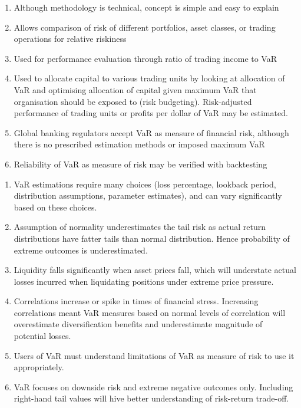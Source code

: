 \begin{remark} 
\begin{enumerate}[label=\roman*.]
\setlength{\itemsep}{0pt}
\item Although methodology is technical, concept is simple and easy to explain
\item Allows comparison of risk of different portfolios, asset classes, or trading operations for relative riskiness
\item Used for performance evaluation through ratio of trading income to VaR
\item Used to allocate capital to various trading units by looking at allocation of VaR and optimising allocation of capital given maximum VaR that organisation should be exposed to (risk budgeting). Risk-adjusted performance of trading units or profits per dollar of VaR may be estimated.
\item Global banking regulators accept VaR as measure of financial risk, although there is no prescribed estimation methods or imposed maximum VaR
\item Reliability of VaR as measure of risk may be verified with backtesting
\end{enumerate}
\end{remark}

\begin{remark} 
\begin{enumerate}[label=\roman*.]
\setlength{\itemsep}{0pt}
\item VaR estimations require many choices (loss percentage, lookback period, distribution assumptions, parameter estimates), and can vary significantly based on these choices.
\item Assumption of normality underestimates the tail risk as actual return distributions have fatter tails than normal distribution. Hence probability of extreme outcomes is underestimated.
\item Liquidity falls significantly when asset prices fall, which will understate actual losses incurred when liquidating positions under extreme price pressure.
\item Correlations increase or spike in times of financial stress. Increasing correlations meant VaR measures based on normal levels of correlation will overestimate diversification benefits and underestimate magnitude of potential losses.
\item Users of VaR must understand limitations of VaR as measure of risk to use it appropriately.
\item VaR focuses on downside risk and extreme negative outcomes only. Including right-hand tail values will hive better understanding of risk-return trade-off.
\end{enumerate}
\end{remark}

